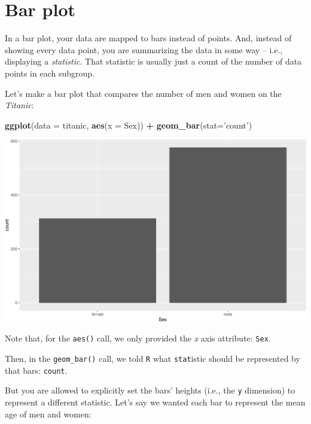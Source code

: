 \documentclass[
]{book}
\newenvironment{Shaded}{\begin{snugshade}}{\end{snugshade}}
\newcommand{\DataTypeTok}[1]{\textcolor[rgb]{0.13,0.29,0.53}{#1}}
\newcommand{\KeywordTok}[1]{\textcolor[rgb]{0.13,0.29,0.53}{\textbf{#1}}}
\newcommand{\NormalTok}[1]{#1}
\newcommand{\OperatorTok}[1]{\textcolor[rgb]{0.81,0.36,0.00}{\textbf{#1}}}
\newcommand{\StringTok}[1]{\textcolor[rgb]{0.31,0.60,0.02}{#1}}
\begin{document}
\hypertarget{bar-plot}{%
\section*{Bar plot}\label{bar-plot}}

In a bar plot, your data are mapped to bars instead of points. And, instead of showing every data point, you are summarizing the data in some way -- i.e., displaying a \emph{statistic}. That statistic is usually just a count of the number of data points in each subgroup.

Let's make a bar plot that compares the number of men and women on the \emph{Titanic}:

\begin{Shaded}
\begin{Highlighting}[]
\KeywordTok{ggplot}\NormalTok{(}\DataTypeTok{data =}\NormalTok{ titanic, }
       \KeywordTok{aes}\NormalTok{(}\DataTypeTok{x =}\NormalTok{ Sex)) }\OperatorTok{+}\StringTok{ }
\StringTok{  }\KeywordTok{geom_bar}\NormalTok{(}\DataTypeTok{stat=}\StringTok{'count'}\NormalTok{)}
\end{Highlighting}
\end{Shaded}

\includegraphics{figures/unnamed-chunk-255-1.pdf}

Note that, for the \texttt{aes()} call, we only provided the \emph{x} axis attribute: \texttt{Sex}.

Then, in the \texttt{geom\_bar()} call, we told \texttt{R} what \texttt{stat}istic should be represented by that bars: \texttt{\textquotesingle{}count\textquotesingle{}}.

But you are allowed to explicitly set the bars' heights (i.e., the \texttt{y} dimension) to represent a different statistic. Let's say we wanted each bar to represent the mean age of men and women:
\end{document}
